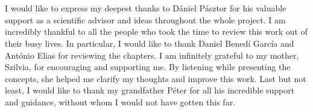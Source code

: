 \chapter*{\koszonetnyilvanitas}

I would like to express my deepest thanks to D\'aniel P\'asztor for his valuable support as a scientific advisor and ideas throughout the whole project. I am incredibly thankful to all the people who took the time to review this work out of their busy lives. In particular, I would like to thank Daniel Bened\'i Garc\'ia and Ant\'onio Elias for reviewing the chapters. I am infinitely grateful to my mother, Szilvia, for encouraging and supporting me. By listening while presenting the concepts, she helped me clarify my thoughts and improve this work. Last but not least, I would like to thank my grandfather P\'eter for all his incredible support and guidance, without whom I would not have gotten this far.